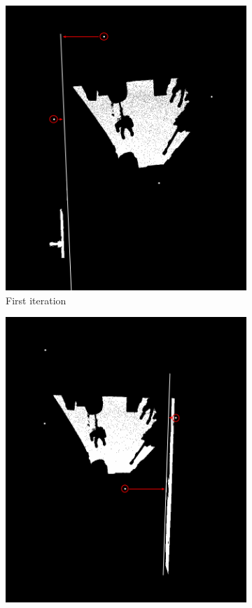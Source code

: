 			\begin{figure}[H] 
				\centering
				\begin{subfigure}[b]{0.4\linewidth}
					\centering
					\includegraphics[width=0.95\linewidth]{"Includes/images/Project Points/F-1"} 
					\caption{First iteration} 
					\label{fig4Adjust:a} 
					\vspace{4ex}
				\end{subfigure}
				\begin{subfigure}[b]{0.4\linewidth}
					\centering
					\includegraphics[width=0.95\linewidth]{"Includes/images/Project Points/F-2"} 

\end{subfigure}
\end{figure}
